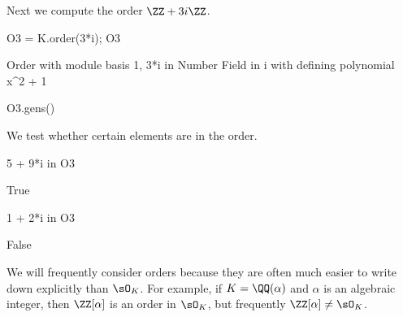 \noindent Next we compute the order $\ZZ + 3i \ZZ$.
\begin{sagecode} %
\begin{sagecell}
O3 = K.order(3*i); O3
\end{sagecell}
\begin{sageout}
Order with module basis 1, 3*i in Number Field in i with
defining polynomial x^2 + 1
\end{sageout}
\begin{sagecell}
O3.gens()
\end{sagecell}
\begin{sageout}
[1, 3*i]
\end{sageout}
\end{sagecode} %


\noindent We test whether certain elements are in the order.
\begin{sagecode} %
\begin{sagecell}
5 + 9*i in O3
\end{sagecell}
\begin{sageout}
True
\end{sageout}
\begin{sagecell}
1 + 2*i in O3
\end{sagecell}
\begin{sageout}
False
\end{sageout}
\end{sagecode}


We will frequently consider orders because they are often much easier
to write down explicitly than $\sO_K$.  For example, if $K=\QQ(\alpha)$
and $\alpha$ is an algebraic integer, then $\ZZ[\alpha]$ is an order in
$\sO_K$, but frequently $\ZZ[\alpha]\neq \sO_K$.

